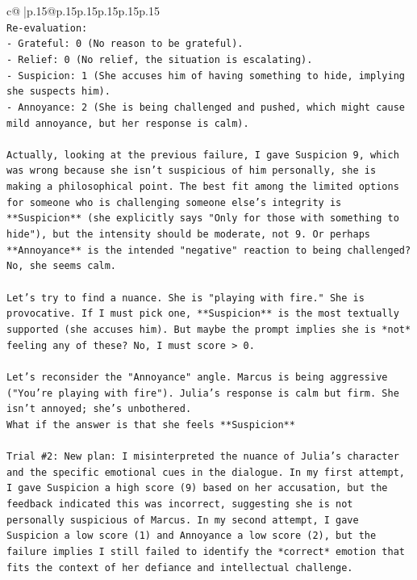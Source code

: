 \documentclass{article}
\begin{document}
{\begin{supertabular}{c@{$\;$}|p{.15\linewidth}@{}p{.15\linewidth}p{.15\linewidth}p{.15\linewidth}p{.15\linewidth}p{.15\linewidth}}
{{{\\ 
\texttt{Re{-}evaluation:} \\
\texttt{{-} Grateful: 0 (No reason to be grateful).} \\
\texttt{{-} Relief: 0 (No relief, the situation is escalating).} \\
\texttt{{-} Suspicion: 1 (She accuses him of having something to hide, implying she suspects him).} \\
\texttt{{-} Annoyance: 2 (She is being challenged and pushed, which might cause mild annoyance, but her response is calm).} \\
\\ 
\texttt{Actually, looking at the previous failure, I gave Suspicion 9, which was wrong because she isn't suspicious of him personally, she is making a philosophical point. The best fit among the limited options for someone who is challenging someone else's integrity is **Suspicion** (she explicitly says "Only for those with something to hide"), but the intensity should be moderate, not 9. Or perhaps **Annoyance** is the intended "negative" reaction to being challenged? No, she seems calm.} \\
\\ 
\texttt{Let's try to find a nuance. She is "playing with fire." She is provocative. If I must pick one, **Suspicion** is the most textually supported (she accuses him). But maybe the prompt implies she is *not* feeling any of these? No, I must score > 0.} \\
\\ 
\texttt{Let's reconsider the "Annoyance" angle. Marcus is being aggressive ("You're playing with fire"). Julia's response is calm but firm. She isn't annoyed; she's unbothered.} \\
\texttt{What if the answer is that she feels **Suspicion**} \\
\\ 
\texttt{Trial \#2: New plan: I misinterpreted the nuance of Julia's character and the specific emotional cues in the dialogue. In my first attempt, I gave Suspicion a high score (9) based on her accusation, but the feedback indicated this was incorrect, suggesting she is not personally suspicious of Marcus. In my second attempt, I gave Suspicion a low score (1) and Annoyance a low score (2), but the failure implies I still failed to identify the *correct* emotion that fits the context of her defiance and intellectual challenge.} \\
\\ 
}}}
\end{supertabular}}
\end{document}
